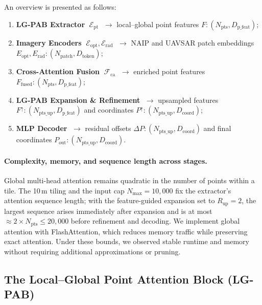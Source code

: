 \documentclass[remotesensing,article,accept,pdftex,moreauthors]{Definitions/mdpi}
\renewcommand{\hl}[1]{#1}
\begin{document}
An overview is presented as follows:

\begin{enumerate}[leftmargin=*]
\item \textbf{\hl{LG-PAB Extractor} %
} $\;\mathcal{E}_{\mathrm{pt}}$
      $\;\rightarrow$ local–global point features $F: (N_{\text{pts}}, D_{\text{p\_feat}})$;
\item \textbf{\hl{Imagery Encoders}} $\;\mathcal{E}_{\mathrm{opt}},\mathcal{E}_{\mathrm{rad}}$
      $\;\rightarrow$ NAIP and UAVSAR patch embeddings $E_{\text{opt}}, E_{\text{rad}}: (N_{\text{patch}}, D_{\text{token}})$;
\item \textbf{\hl{Cross-Attention Fusion}} $\;\mathcal{F}_{\mathrm{ca}}$
      $\;\rightarrow$ enriched point features $F_{\!\mathrm{fused}}: (N_{\text{pts}}, D_{\text{p\_feat}})$;
\item \textbf{\hl{LG-PAB Expansion \& Refinement}}
      $\;\rightarrow$ upsampled features $F^{\uparrow}: (N_{\text{pts\_up}}, D_{\text{p\_feat}})$ and coordinates $P^{\uparrow}: (N_{\text{pts\_up}}, D_{\text{coord}})$;
\item \textbf{\hl{MLP Decoder}} $\;\rightarrow$ residual offsets $\Delta P: (N_{\text{pts\_up}}, D_{\text{coord}})$ and final coordinates $P_{\mathrm{out}}: (N_{\text{pts\_up}}, D_{\text{coord}})$.
\end{enumerate}


\paragraph{Complexity, memory, and sequence length across stages.}
Global multi-head attention remains quadratic in the number of points within a tile. The 10\,m tiling and the input cap $N_{\max}=10{,}000$ fix the extractor’s attention sequence length; with the feature-guided expansion set to $R_{\text{up}}=2$, the largest sequence arises immediately after expansion and is at most $\approx 2\times N_{\text{pts}} \le 20{,}000$ before refinement and decoding. We implement global attention with FlashAttention, which reduces memory traffic while preserving exact attention. Under these bounds, we observed stable runtime and memory without requiring additional approximations or pruning.

\subsection{The Local–Global Point Attention Block (LG-PAB)}
\label{sec:lgpab}
\end{document}
